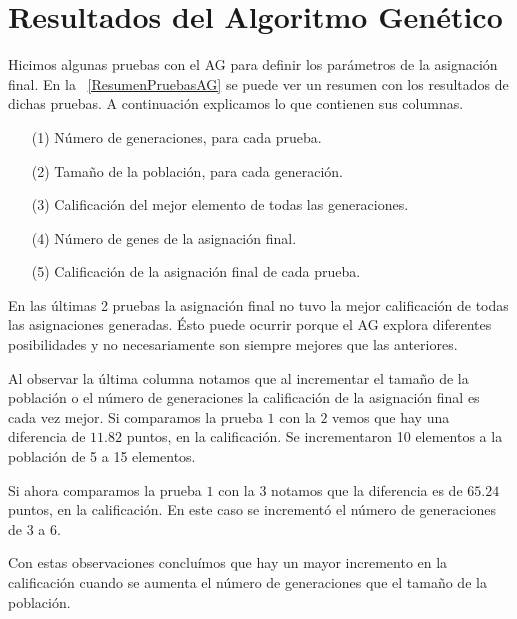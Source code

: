 \section{Resultados del Algoritmo Genético} \label{Sec_Resultados_AG}

Hicimos algunas pruebas con el AG para definir los parámetros de la asignación final. En la \tablename{~\ref{ResumenPruebasAG}} se puede ver un resumen con los resultados de dichas pruebas. A continuación explicamos lo que contienen sus columnas.

\begin{itemize}
\item[(1)] Número de generaciones, para cada prueba.

\item[(2)] Tamaño de la población, para cada generación.

\item[(3)] Calificación del mejor elemento de todas las generaciones.

\item[(4)] Número de genes de la asignación final.

\item[(5)] Calificación de la asignación final de cada prueba.
\end{itemize}

En las últimas 2 pruebas la asignación final no tuvo la mejor calificación de todas las asignaciones generadas. Ésto puede ocurrir porque el AG explora diferentes posibilidades y no necesariamente son siempre mejores que las anteriores.

Al observar la última columna notamos que al incrementar el tamaño de la población o el número de generaciones la calificación de la asignación final es cada vez mejor. Si comparamos la prueba $1$ con la $2$ vemos que hay una diferencia de $11.82$ puntos, en la calificación. Se incrementaron 10 elementos a la población de 5 a 15 elementos.

Si ahora comparamos la prueba $1$ con la $3$ notamos que la diferencia es de $65.24$ puntos, en la calificación. En este caso se incrementó el número de generaciones de 3 a 6.

Con estas observaciones concluímos que hay un mayor incremento en la calificación cuando se aumenta el número de generaciones que el tamaño de la población.

